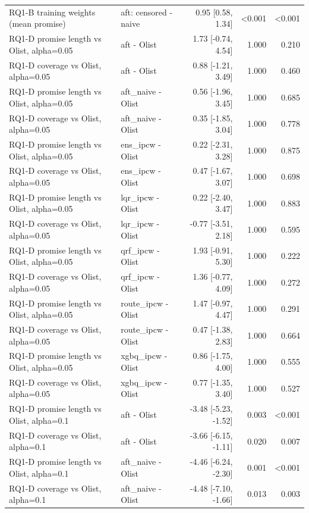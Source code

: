 \begin{table}[!htbp]
\begin{tabular}{llrrr}
RQ1-B training weights (mean promise) & aft: censored - naive & 0.95 [0.58, 1.34] & <0.001 & <0.001 \\
RQ1-D promise length vs Olist, alpha=0.05 & aft - Olist & 1.73 [-0.74, 4.54] & 1.000 & 0.210 \\
RQ1-D coverage vs Olist, alpha=0.05 & aft - Olist & 0.88 [-1.21, 3.49] & 1.000 & 0.460 \\
RQ1-D promise length vs Olist, alpha=0.05 & aft\_naive - Olist & 0.56 [-1.96, 3.45] & 1.000 & 0.685 \\
RQ1-D coverage vs Olist, alpha=0.05 & aft\_naive - Olist & 0.35 [-1.85, 3.04] & 1.000 & 0.778 \\
RQ1-D promise length vs Olist, alpha=0.05 & ens\_ipcw - Olist & 0.22 [-2.31, 3.28] & 1.000 & 0.875 \\
RQ1-D coverage vs Olist, alpha=0.05 & ens\_ipcw - Olist & 0.47 [-1.67, 3.07] & 1.000 & 0.698 \\
RQ1-D promise length vs Olist, alpha=0.05 & lqr\_ipcw - Olist & 0.22 [-2.40, 3.47] & 1.000 & 0.883 \\
RQ1-D coverage vs Olist, alpha=0.05 & lqr\_ipcw - Olist & -0.77 [-3.51, 2.18] & 1.000 & 0.595 \\
RQ1-D promise length vs Olist, alpha=0.05 & qrf\_ipcw - Olist & 1.93 [-0.91, 5.30] & 1.000 & 0.222 \\
RQ1-D coverage vs Olist, alpha=0.05 & qrf\_ipcw - Olist & 1.36 [-0.77, 4.09] & 1.000 & 0.272 \\
RQ1-D promise length vs Olist, alpha=0.05 & route\_ipcw - Olist & 1.47 [-0.97, 4.47] & 1.000 & 0.291 \\
RQ1-D coverage vs Olist, alpha=0.05 & route\_ipcw - Olist & 0.47 [-1.38, 2.83] & 1.000 & 0.664 \\
RQ1-D promise length vs Olist, alpha=0.05 & xgbq\_ipcw - Olist & 0.86 [-1.75, 4.00] & 1.000 & 0.555 \\
RQ1-D coverage vs Olist, alpha=0.05 & xgbq\_ipcw - Olist & 0.77 [-1.35, 3.40] & 1.000 & 0.527 \\
RQ1-D promise length vs Olist, alpha=0.1 & aft - Olist & -3.48 [-5.23, -1.52] & 0.003 & <0.001 \\
RQ1-D coverage vs Olist, alpha=0.1 & aft - Olist & -3.66 [-6.15, -1.11] & 0.020 & 0.007 \\
RQ1-D promise length vs Olist, alpha=0.1 & aft\_naive - Olist & -4.46 [-6.24, -2.30] & 0.001 & <0.001 \\
RQ1-D coverage vs Olist, alpha=0.1 & aft\_naive - Olist & -4.48 [-7.10, -1.66] & 0.013 & 0.003 \\

\end{tabular}
\end{table}
